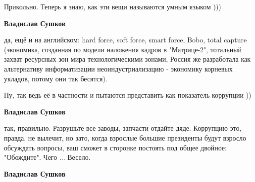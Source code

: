 \begin{itemize}
\begin{itemize}
 
Прикольно. Теперь я знаю, как эти вещи называются умным языком )))

 
\textbf{Владислав Сушков} 

да, ещё и на английском: hard force, soft force, smart force, Bobo, total
capture (экономика, созданная по модели наложения кадров в "Матрице-2",
тотальный захват ресурсных зон мира технологическими зонами, Россия же
разработала как альтернативу информатизации неоиндустриализацию - экономику
корневых укладов, потому они так бесятся).

 

Ну, так ведь её в частности и пытаются представить как показатель коррупции ))


 
\textbf{Владислав Сушков} 

так, правильно. Разрушьте все заводы, запчасти
отдайте дяде. Коррупцию это, правда, не вылечит, но зато, когда взрослые
большие президенты будут взросло обсуждать вопросы, ваш сможет в сторонке
постоять под общее двойное: "Обождите". Чего ... Весело.


 
\textbf{Владислав Сушков} 


\end{itemize}
\end{itemize}
